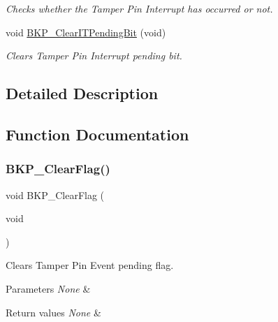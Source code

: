 \begin{DoxyCompactItemize}
\begin{DoxyCompactList}\small\item\em Checks whether the Tamper Pin Interrupt has occurred or not. \end{DoxyCompactList}\item 
void \mbox{\hyperlink{group___b_k_p___exported___functions_ga6a93ef8e40959bb10fea670e2040ad74}{B\+K\+P\+\_\+\+Clear\+I\+T\+Pending\+Bit}} (void)
\begin{DoxyCompactList}\small\item\em Clears Tamper Pin Interrupt pending bit. \end{DoxyCompactList}\end{DoxyCompactItemize}


\subsection{Detailed Description}


\subsection{Function Documentation}
\mbox{\label{group___b_k_p___exported___functions_ga3f3aea5b0a3d8d5d79b0b506928351ea}} 
\subsubsection{\texorpdfstring{BKP\_ClearFlag()}{BKP\_ClearFlag()}}
{\footnotesize\ttfamily void B\+K\+P\+\_\+\+Clear\+Flag (\begin{DoxyParamCaption}\item[{void}]{ }\end{DoxyParamCaption})}



Clears Tamper Pin Event pending flag. 


\begin{DoxyParams}{Parameters}
{\em None} & \\
\hline
\end{DoxyParams}

\begin{DoxyRetVals}{Return values}
{\em None} & \\
\hline
\end{DoxyRetVals}
\mbox{\label{group___b_k_p___exported___functions_ga6a93ef8e40959bb10fea670e2040ad74}} 
